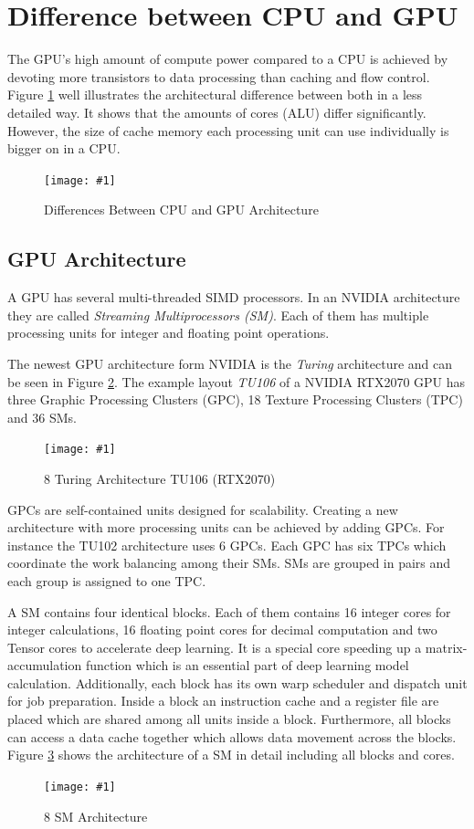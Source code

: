 \documentclass[a4paper,12pt]{llncs}
\numberwithin{equation}{section}
\newcommand{\bildbreite}[5]{
  \begin{figure}[htbp]
    \begin{center}
      \texttt{[image: \#1]}
      \caption[#5]{#4}
      \label{#3}
    \end{center}
  \end{figure}
}
\begin{document}
    
    
\section{Difference between CPU and GPU}

  
  The GPU's high amount of compute power compared to a CPU is achieved by devoting more transistors to data processing than caching and flow control.~\cite{NVIDIA.2019}
  Figure \ref{fig:GPU_CPU_Arc} well illustrates the architectural difference between both in a less detailed way.
  It shows that the amounts of cores (ALU) differ significantly.
  However, the size of cache memory each processing unit can use individually is bigger on in a CPU.
  \bildbreite{figures/CPU_GPU_Arc.JPG}{9cm}{fig:GPU_CPU_Arc}{Differences Between CPU and GPU Architecture~\cite{NVIDIA.2019}}{}
  
  
\subsection{GPU Architecture}
\label{subsec:GPU_Arc}
  A GPU has several multi-threaded SIMD processors.
  In an NVIDIA architecture they are called \textit{Streaming Multiprocessors (SM)}.
  Each of them has multiple processing units for integer and floating point operations. ~\cite{Rauber.2012}

  The newest GPU architecture form NVIDIA is the \textit{Turing} architecture and can be seen in Figure \ref{fig:turingOverall}.
  The example layout \textit{TU106} of a NVIDIA RTX2070 GPU has three Graphic Processing Clusters (GPC), 18 Texture Processing Clusters (TPC) and 36 SMs.~\cite{NVIDIA.2018}
  	  \bildbreite{figures/Turing_architecture.JPG}{\textwidth}{fig:turingOverall}{8 Turing Architecture TU106 (RTX2070)}{}
  	  
  GPCs are self-contained units designed for scalability.
  Creating a new architecture with more processing units can be achieved by adding GPCs.
  For instance the TU102 architecture uses 6 GPCs.
  Each GPC has six TPCs which coordinate the work balancing among their SMs.
  SMs are grouped in pairs and each group is assigned to one TPC.~\cite{Lindholm.2008}~\cite{NVIDIA.2018}
    
  A SM contains four identical blocks.
  Each of them contains 16 integer cores for integer calculations, 16 floating point cores for decimal computation and two Tensor cores to accelerate deep learning.
  It is a special core speeding up a matrix-accumulation function which is an essential part of deep learning model calculation.
  Additionally, each block has its own warp scheduler and dispatch unit for job preparation.
  Inside a block an instruction cache and a register file are placed which are shared among all units inside a block.
  Furthermore, all blocks can access a data cache together which allows data movement across the blocks.
  Figure \ref{fig:smArch} shows the architecture of a SM in detail including all blocks and cores.~\cite{Burgess.2020}~\cite{NVIDIA.2018}
	  \bildbreite{figures/SM_arch.jpg}{6cm}{fig:smArch}{8 SM Architecture}{}
\end{document}
